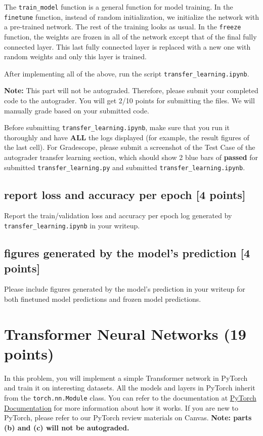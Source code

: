 \documentclass[lang=cn,11pt]{elegantbook}
\begin{document}
The \texttt{train\_model} function is a general function for model training. In the \texttt{finetune} function, instead of random initialization, we initialize the network with a pre-trained network. The rest of the training looks as usual. In the \texttt{freeze} function, the weights are frozen in all of the network except that of the final fully connected layer. This last fully connected layer is replaced with a new one with random weights and only this layer is trained.

After implementing all of the above, run the script \texttt{transfer\_learning.ipynb}.

\textbf{Note:} This part will not be autograded. Therefore, please submit your completed code to the autograder. You will get 2/10 points for submitting the files. We will manually grade based on your submitted code.

Before submitting \texttt{transfer\_learning.ipynb}, make sure that you run it thoroughly and have \textbf{ALL} the logs displayed (for example, the result figures of the last cell). For Gradescope, please submit a screenshot of the Test Case of the autograder transfer learning section, which should show 2 blue bars of \textbf{passed} for submitted \texttt{transfer\_learning.py} and submitted \texttt{transfer\_learning.ipynb}.


\subsection*{report loss and accuracy per epoch [4 points]}
Report the train/validation loss and accuracy per epoch log generated by \texttt{transfer\_learning.ipynb} in your writeup.

\subsection*{figures generated by the model’s prediction [4 points]}
Please include figures generated by the model’s prediction in your writeup for both finetuned model predictions and frozen model predictions.








\section{Transformer Neural Networks (19 points)}

In this problem, you will implement a simple Transformer network in PyTorch and train it on interesting datasets. All the models and layers in PyTorch inherit from the \texttt{torch.nn.Module} class. You can refer to the documentation at \href{https://pytorch.org/docs/stable/generated/torch.nn.Module.html}{PyTorch Documentation} for more information about how it works. If you are new to PyTorch, please refer to our PyTorch review materials on Canvas. \textbf{Note: parts (b) and (c) will not be autograded.}
\end{document}
